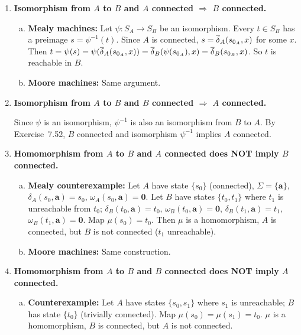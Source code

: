\begin{enumerate}[{7.}1.]
\item \textbf{Isomorphism from $A$ to $B$ and $A$ connected $\Rightarrow$ $B$ connected.}

\begin{enumerate}[(a)]
  \item \textbf{Mealy machines:}  Let $\psi:S_A\to S_B$ be an isomorphism.  Every $t\in S_B$ has a preimage $s=\psi^{-1}(t)$.  Since $A$ is connected, $s=\overline{\delta}_A(s_{0_A},x)$ for some $x$.  Then $t=\psi(s)=\psi(\overline{\delta}_A(s_{0_A},x))=\overline{\delta}_B(\psi(s_{0_A}),x)=\overline{\delta}_B(s_{0_B},x)$.  So $t$ is reachable in $B$.

  \item \textbf{Moore machines:}  Same argument.
\end{enumerate}

\item \textbf{Isomorphism from $A$ to $B$ and $B$ connected $\Rightarrow$ $A$ connected.}

Since $\psi$ is an isomorphism, $\psi^{-1}$ is also an isomorphism from $B$ to $A$.  By Exercise~7.52, $B$ connected and isomorphism $\psi^{-1}$ implies $A$ connected.

\item \textbf{Homomorphism from $A$ to $B$ and $A$ connected does NOT imply $B$ connected.}

\begin{enumerate}[(a)]
  \item \textbf{Mealy counterexample:}  Let $A$ have state $\{s_0\}$ (connected), $\Sigma=\{\pmb{a}\}$, $\delta_A(s_0,\pmb{a})=s_0$, $\omega_A(s_0,\pmb{a})=\pmb{0}$.  Let $B$ have states $\{t_0,t_1\}$ where $t_1$ is unreachable from $t_0$; $\delta_B(t_0,\pmb{a})=t_0$, $\omega_B(t_0,\pmb{a})=\pmb{0}$, $\delta_B(t_1,\pmb{a})=t_1$, $\omega_B(t_1,\pmb{a})=\pmb{0}$.  Map $\mu(s_0)=t_0$.  Then $\mu$ is a homomorphism, $A$ is connected, but $B$ is not connected ($t_1$ unreachable).

  \item \textbf{Moore machines:} Same construction.
\end{enumerate}

\item \textbf{Homomorphism from $A$ to $B$ and $B$ connected does NOT imply $A$ connected.}

\begin{enumerate}[(a)]
  \item \textbf{Counterexample:}  Let $A$ have states $\{s_0,s_1\}$ where $s_1$ is unreachable; $B$ has state $\{t_0\}$ (trivially connected).  Map $\mu(s_0)=\mu(s_1)=t_0$.  $\mu$ is a homomorphism, $B$ is connected, but $A$ is not connected.


\end{enumerate}
\end{enumerate}
